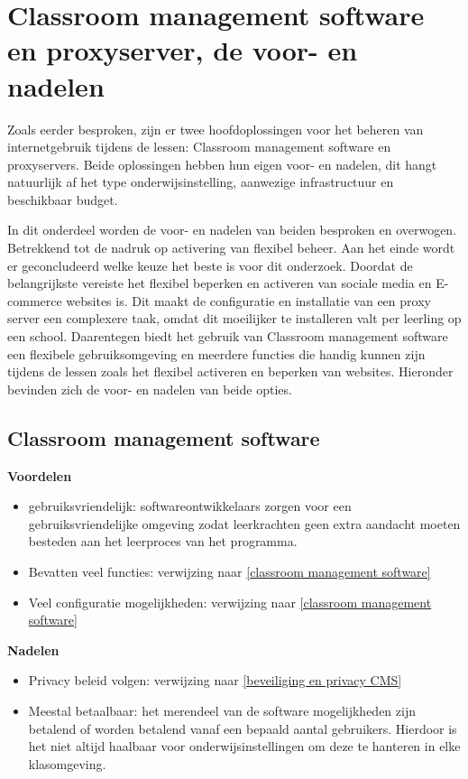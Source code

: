 \section{Classroom management software en proxyserver, de voor- en nadelen}
Zoals eerder besproken, zijn er twee hoofdoplossingen voor het beheren van internetgebruik tijdens de lessen: Classroom management software en proxyservers. 
Beide oplossingen hebben hun eigen voor- en nadelen, dit hangt natuurlijk af het type onderwijsinstelling, aanwezige infrastructuur en beschikbaar budget.\newline

In dit onderdeel worden de voor- en nadelen van beiden besproken en overwogen. Betrekkend tot de nadruk op activering van flexibel beheer. Aan het einde wordt er geconcludeerd welke keuze het beste is voor dit onderzoek. 
Doordat de belangrijkste vereiste het flexibel beperken en activeren van sociale media en E-commerce websites is. Dit maakt de configuratie en installatie van een proxy server een complexere taak, omdat dit moeilijker te installeren valt per leerling op een school. Daarentegen biedt het gebruik van Classroom management software een flexibele gebruiksomgeving en meerdere functies die handig kunnen zijn tijdens de lessen zoals het flexibel activeren en beperken van websites. Hieronder bevinden zich de voor- en nadelen van beide opties. \newline

\subsection{Classroom management software}
\textbf{Voordelen}
\begin{itemize}
    \item gebruiksvriendelijk: softwareontwikkelaars zorgen voor een gebruiksvriendelijke omgeving zodat leerkrachten geen extra aandacht moeten besteden aan het leerproces van het programma. 
    \item Bevatten veel functies: verwijzing naar \ref{classroom management software}
    \item Veel configuratie mogelijkheden: verwijzing naar \ref{classroom management software}
\end{itemize}
\textbf{Nadelen}
\begin{itemize}
    \item Privacy beleid volgen: verwijzing naar \ref{beveiliging en privacy CMS}
    \item Meestal betaalbaar: het merendeel van de software mogelijkheden zijn betalend of worden betalend vanaf een bepaald aantal gebruikers. Hierdoor is het niet altijd haalbaar voor onderwijsinstellingen om deze te hanteren in elke klasomgeving. 
\end{itemize}

